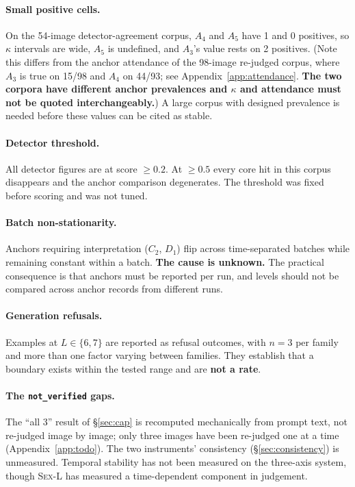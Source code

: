 \documentclass[11pt]{article}
\newcommand{\sexl}{\textsc{Sex-L}}
\begin{document}
\paragraph{Small positive cells.} On the 54-image detector-agreement corpus,
$A_4$ and $A_5$ have 1 and 0 positives, so $\kappa$ intervals are wide, $A_5$
is undefined, and $A_3$'s value rests on 2 positives. (Note this differs from
the anchor attendance of the 98-image re-judged corpus, where $A_3$ is true on
15/98 and $A_4$ on 44/93; see Appendix~\ref{app:attendance}. \textbf{The two
corpora have different anchor prevalences and $\kappa$ and attendance must not
be quoted interchangeably.}) A large corpus with designed prevalence is needed
before these values can be cited as stable.

\paragraph{Detector threshold.} All detector figures are at score $\ge 0.2$.
At $\ge 0.5$ every core hit in this corpus disappears and the anchor comparison
degenerates. The threshold was fixed before scoring and was not tuned.

\paragraph{Batch non-stationarity.} Anchors requiring interpretation ($C_2$,
$D_1$) flip across time-separated batches while remaining constant within a
batch. \textbf{The cause is unknown.} The practical consequence is that anchors
must be reported per run, and levels should not be compared across anchor
records from different runs.

\paragraph{Generation refusals.} Examples at $L\in\{6,7\}$ are reported as
refusal outcomes, with $n=3$ per family and more than one factor varying
between families. They establish that a boundary exists within the tested range
and are \textbf{not a rate}.

\paragraph{The \texttt{not\_verified} gaps.} The ``all 3'' result of
\S\ref{sec:cap} is recomputed mechanically from prompt text, not re-judged
image by image; only three images have been re-judged one at a time
(Appendix~\ref{app:todo}). The two instruments' consistency
(\S\ref{sec:consistency}) is unmeasured. Temporal stability has not been
measured on the three-axis system, though \sexl{} has measured a
time-dependent component in judgement.
\end{document}

